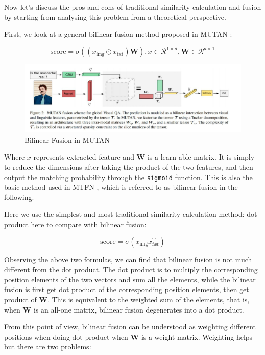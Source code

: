 Now let's discuss the pros and cons of traditional similarity calculation and fusion by starting from analysing this problem from a theoretical perspective.

First, we look at a general bilinear fusion method proposed in MUTAN \cite{benyounes2017mutan}:

$$
\text {score}=\sigma\left(\left(x_{\text {img}} \odot x_{\text {txt}}\right) \mathbf{W}\right), x \in \mathcal{R}^{1 \times d}, \mathbf{W} \in \mathcal{R}^{d \times 1}
$$

\begin{figure}[h!]
\centering
\includegraphics[width=\textwidth]{MUTAN.pdf}
\caption{Bilinear Fusion in MUTAN \cite{benyounes2017mutan}}
\label{fig:mutan}
\end{figure}

Where $x$ represents extracted feature and $\mathbf{W}$ is a learn-able matrix. It is simply to reduce the dimensions after taking the product of the two features, and then output the matching probability through the \verb|sigmoid| function. This is also the basic method used in MTFN \cite{MTFN}, which is referred to as bilinear fusion in the following.

Here we use the simplest and most traditional similarity calculation method: dot product here to compare with bilinear fusion:

$$
\text {score}=\sigma\left(x_{\text {img}} x_{t x t}^{\mathrm{T}}\right)
$$

Observing the above two formulas, we can find that bilinear fusion is not much different from the dot product. The dot product is to multiply the corresponding position elements of the two vectors and sum all the elements, while the bilinear fusion is first get dot product of the corresponding position elements, then get product of $\mathbf{W}$. This is equivalent to the weighted sum of the elements, that is, when $\mathbf{W}$ is an all-one matrix, bilinear fusion degenerates into a dot product.

From this point of view, bilinear fusion can be understood as weighting different positions when doing dot product when $\mathbf{W}$ is a weight matrix. Weighting helps but there are two problems:

